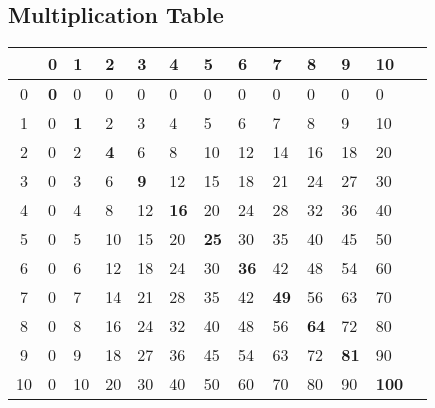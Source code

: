 \documentclass[a4paper,11pt ]{book}
\begin{document}
\subsection{Multiplication Table}
\begin{table}[h]
\centering
\begin{tabular}{c| llllllllllll}
   & 0          & 1          & 2          & 3          & 4           & 5           & 6           & 7           & 8           & 9           & 10            \\
   \hline
0  & \textbf{0} & 0          & 0          & 0          & 0           & 0           & 0           & 0           & 0           & 0           & 0             \\
1  & 0          & \textbf{1} & 2          & 3          & 4           & 5           & 6           & 7           & 8           & 9           & 10            \\
2  & 0          & 2          & \textbf{4} & 6          & 8           & 10          & 12          & 14          & 16          & 18          & 20            \\
3  & 0          & 3          & 6          & \textbf{9} & 12          & 15          & 18          & 21          & 24          & 27          & 30            \\
4  & 0          & 4          & 8          & 12         & \textbf{16} & 20          & 24          & 28          & 32          & 36          & 40            \\
5  & 0          & 5          & 10         & 15         & 20          & \textbf{25} & 30          & 35          & 40          & 45          & 50            \\
6  & 0          & 6          & 12         & 18         & 24          & 30          & \textbf{36} & 42          & 48          & 54          & 60            \\
7  & 0          & 7          & 14         & 21         & 28          & 35          & 42          & \textbf{49} & 56          & 63          & 70            \\
8  & 0          & 8          & 16         & 24         & 32          & 40          & 48          & 56          & \textbf{64} & 72          & 80            \\
9  & 0          & 9          & 18         & 27         & 36          & 45          & 54          & 63          & 72          & \textbf{81} & 90            \\
10 & 0          & 10         & 20         & 30         & 40          & 50          & 60          & 70          & 80          & 90          & \textbf{100} 
\end{tabular}
\end{table}
\end{document}
